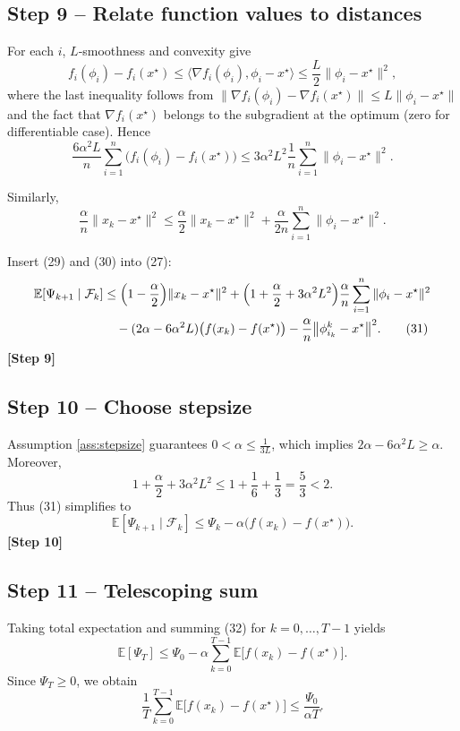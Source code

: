 \documentclass{article}
\newcommand{\E}{\mathbb{E}}
\begin{document}
\subsection*{Step 9 – Relate function values to distances}
For each $i$, $L$‑smoothness and convexity give
\[
f_i(\phi_i)-f_i(x^\star)\le\langle\nabla f_i(\phi_i),\phi_i-x^\star\rangle
\le \frac{L}{2}\|\phi_i-x^\star\|^2,
\tag{28}
\]
where the last inequality follows from $\|\nabla f_i(\phi_i)-\nabla f_i(x^\star)\|\le L\|\phi_i-x^\star\|$ and the fact that $\nabla f_i(x^\star)$ belongs to the subgradient at the optimum (zero for differentiable case). Hence
\[
\frac{6\alpha^2L}{n}\sum_{i=1}^{n}\bigl(f_i(\phi_i)-f_i(x^\star)\bigr)
\le 3\alpha^2L^2\frac{1}{n}\sum_{i=1}^{n}\|\phi_i-x^\star\|^2.
\tag{29}
\]

Similarly,
\[
\frac{\alpha}{n}\|x_k-x^\star\|^2\le\frac{\alpha}{2}\|x_k-x^\star\|^2+\frac{\alpha}{2n}\sum_{i=1}^{n}\|\phi_i-x^\star\|^2.
\tag{30}
\]

Insert (29) and (30) into (27):
\begin{align}
\E[\Psi_{k+1}\mid\mathcal F_k]
&\le \Bigl(1-\frac{\alpha}{2}\Bigr)\|x_k-x^\star\|^2
+\Bigl(1+\frac{\alpha}{2}+3\alpha^2L^2\Bigr)\frac{\alpha}{n}\sum_{i=1}^{n}\|\phi_i-x^\star\|^2 \nonumber\\
&\quad -(2\alpha-6\alpha^2L)\bigl(f(x_k)-f(x^\star)\bigr)
-\frac{\alpha}{n}\bigl\|\phi_{i_k}^{k}-x^\star\bigr\|^2.
\tag{31}
\end{align}
\textbf{[Step 9]}

\subsection*{Step 10 – Choose stepsize}
Assumption \eqref{ass:stepsize} guarantees $0<\alpha\le\frac{1}{3L}$, which implies $2\alpha-6\alpha^2L\ge\alpha$. Moreover,
\[
1+\frac{\alpha}{2}+3\alpha^2L^2\le 1+\frac{1}{6}+ \frac{1}{3}= \frac{5}{3}<2.
\]
Thus (31) simplifies to
\[
\E[\Psi_{k+1}\mid\mathcal F_k]\le \Psi_k-\alpha\bigl(f(x_k)-f(x^\star)\bigr).
\tag{32}
\]
\textbf{[Step 10]}

\subsection*{Step 11 – Telescoping sum}
Taking total expectation and summing (32) for $k=0,\dots,T-1$ yields
\[
\E[\Psi_T]\le \Psi_0-\alpha\sum_{k=0}^{T-1}\E\bigl[f(x_k)-f(x^\star)\bigr].
\tag{33}
\]
Since $\Psi_T\ge0$, we obtain
\[
\frac{1}{T}\sum_{k=0}^{T-1}\E\bigl[f(x_k)-f(x^\star)\bigr]\le\frac{\Psi_0}{\alpha T}.
\tag{34}
\]
\end{document}
